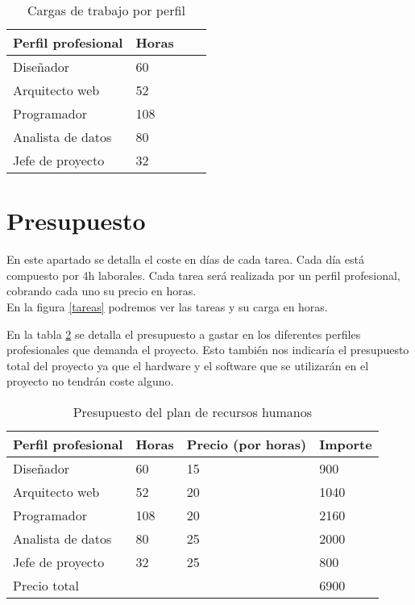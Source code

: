 \begin{table}[]
	\centering
	\begin{tabular}{llll}
		\textbf{Perfil profesional} & \textbf{Horas}  \\ \hline
		Diseñador                   & 60             \\
		Arquitecto web              & 52             \\
		Programador                 & 108             \\
		Analista de datos           & 80             \\
		Jefe de proyecto            & 32             \\
	\end{tabular}
	\caption{Cargas de trabajo por perfil}
	\label{cargas}
\end{table}


\section{Presupuesto}
En este apartado se detalla el coste en días de cada tarea. Cada día está compuesto por 4h laborales. Cada tarea será realizada por un perfil profesional, cobrando cada uno su precio en horas.\\

En la figura \ref{tareas} podremos ver las tareas y su carga en horas.\\


En la tabla \ref{precios} se detalla el presupuesto a gastar en los diferentes perfiles profesionales que demanda el proyecto. Esto también nos indicaría el presupuesto total del proyecto ya que el hardware y el software que se utilizarán en el proyecto no tendrán coste alguno.

\begin{table}[]
	\centering
	\begin{tabular}{llll}
		\textbf{Perfil profesional} & \textbf{Horas} & \textbf{Precio (por horas)} & \textbf{Importe} \\ \hline
		Diseñador                   & 60            & 15                          & 900             \\
		Arquitecto web              & 52            & 20                          & 1040             \\
		Programador                 & 108            & 20                          & 2160             \\
		Analista de datos           & 80            & 25                          & 2000             \\
		Jefe de proyecto            & 32            & 25                          & 800             \\
		\hline Precio total                &                &                     & 6900
	\end{tabular}
	\caption{Presupuesto del plan de recursos humanos}
	\label{precios}
\end{table}
